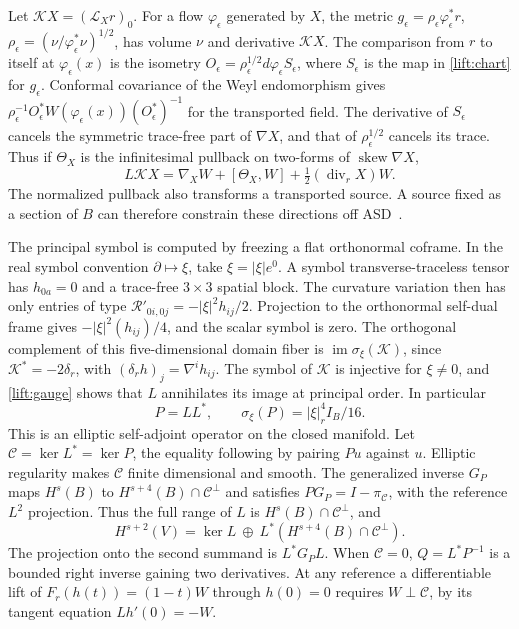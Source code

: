 \documentclass[11pt]{article}
\numberwithin{equation}{section}
\theoremstyle{definition}
\theoremstyle{remark}
\begin{document}
Let \(\mathcal KX=(\mathcal L_X r)_0\). For a flow
\(\varphi_\epsilon\) generated by \(X\), the metric
\(g_\epsilon=\rho_\epsilon\varphi_\epsilon^*r\),
\(\rho_\epsilon=(\nu/\varphi_\epsilon^*\nu)^{1/2}\), has volume
\(\nu\) and derivative \(\mathcal KX\). The comparison from \(r\) to
itself at \(\varphi_\epsilon(x)\) is the isometry
\(O_\epsilon=\rho_\epsilon^{1/2}d\varphi_\epsilon S_\epsilon\),
where \(S_\epsilon\) is the map in \eqref{lift:chart} for \(g_\epsilon\).
Conformal covariance of the Weyl endomorphism gives
\(\rho_\epsilon^{-1} O_\epsilon^*W(\varphi_\epsilon(x))(O_\epsilon^*)^{-1}\)
for the transported field. The derivative of \(S_\epsilon\) cancels
the symmetric trace-free part of \(\nabla X\), and that of
\(\rho_\epsilon^{1/2}\) cancels its trace. Thus if \(\Theta_X\) is the
infinitesimal pullback on two-forms of \(\operatorname{skew}\nabla X\),
\begin{equation}\label{lift:gauge}
 L\mathcal KX=\nabla_X W+[\Theta_X,W]+\tfrac12(\operatorname{div}_r X)W .
\end{equation}
The normalized pullback also transforms a transported source. A source
fixed as a section of \(B\) can therefore constrain these directions
off ASD~\cite[discussion after (6.7)]{FeffermanGraham2008Ambient}.

The principal symbol is computed by freezing a flat orthonormal
coframe. In the real symbol convention \(\partial\mapsto\xi\), take
\(\xi=|\xi|e^0\). A symbol transverse-traceless tensor has
\(h_{0a}=0\) and a trace-free \(3\times3\) spatial block. The curvature
variation then has only entries of type
\(\mathcal R'_{0i,0j}=-|\xi|^2h_{ij}/2\). Projection to the orthonormal
self-dual frame gives \(-|\xi|^2(h_{ij})/4\), and the scalar symbol is zero.
The orthogonal complement of this five-dimensional domain fiber is
\(\operatorname{im}\sigma_\xi(\mathcal K)\), since
\(\mathcal K^*=-2\delta_r\), with
\((\delta_r h)_j=\nabla^i h_{ij}\). The symbol of \(\mathcal K\) is
injective for \(\xi\ne0\), and \eqref{lift:gauge} shows that \(L\)
annihilates its image at principal order. In particular
\begin{equation}\label{lift:normal}
 P=LL^*,\qquad \sigma_\xi(P)=|\xi|_r^4I_B/16 .
\end{equation}
This is an elliptic self-adjoint operator on the closed manifold.
Let \(\mathcal C=\ker L^*=\ker P\), the equality following by pairing
\(Pu\) against \(u\). Elliptic regularity makes \(\mathcal C\) finite
dimensional and smooth. The generalized inverse \(G_P\) maps
\(H^s(B)\) to \(H^{s+4}(B)\cap\mathcal C^\perp\) and satisfies
\(PG_P=I-\pi_{\mathcal C}\), with the reference \(L^2\) projection.
Thus the full range of \(L\) is \(H^s(B)\cap\mathcal C^\perp\), and
\begin{equation}\label{lift:split}
 H^{s+2}(V)=\ker L\ \oplus\
 L^*(H^{s+4}(B)\cap\mathcal C^\perp).
\end{equation}
The projection onto the second summand is \(L^*G_P L\).
When \(\mathcal C=0\), \(Q=L^*P^{-1}\) is a bounded right inverse
gaining two derivatives. At any reference a differentiable lift of
\(F_r(h(t))=(1-t)W\) through \(h(0)=0\) requires \(W\perp\mathcal C\),
by its tangent equation \(Lh'(0)=-W\).
\end{document}
